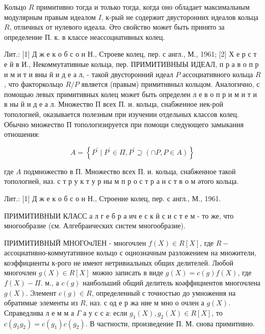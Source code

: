 \documentclass[10pt]{article}
\begin{document}
Кольцо $R$ примитивно тогда и только тогда, когда оно обладает максимальным модулярным правым идеалом $I$, к-рый не содержит двусторонних идеалов кольца $R$, отличных от нулевого идеала. Әто свойство может быть принято за определение П. к. в классе неассоциативных колец.



Лит.: [1] Д ж е к о б с о н Н., Строеве колец, пер. с англ., М., 1961; [2] Х е р с т е й в И., Некоммутативные кольца, пер. ПРИМИТИВНЫЫ ИДЕАЛ, п р а в о п р и м и т и вны й и д е а л, - такой двусторонний идеал $P$ ассоциативного кольца $R$, что факторкольцо $R / P$ является (правым) примитивныл кольцом. Аналогично, с помощью левых примитивных колец может быть определен л е в о п р и м и т и в ны й и д е а л. Множество П всех П. и. кольца, снабженное нек-рой топологией, оказывается полезным при изучении отдельных классов колец. Обычно множество П топологизируется при помощи следующего замыкания отношения:



\[

A=\left\{P^{\prime} \mid P^{\prime} \in \Pi, P^{\prime} \supseteq(\cap P, P \in A)\right\}

\]



где $A$ подмножество в П. Множество всех П. и. кольца, снабженное такой топологией, наз. с т р у к т у р ны м п р о с т р а н с т в о м әтого кольца.



Лит.: [1] Д ж е к о б с о н Н., Строение колец, пер. с англ., М., 1961.



ПРИМИТИВНЫИ КЛАСС а л г е б р а ич е с к й с и с т е м - то же, что многообразие (см. Алгебраических систем многообразие).



ПРИМИТИВНЫЙ МНОГОчЛЕН - многочлен $f(X) \in R[X]$, где $R-$ ассоциативно-коммутативное кольцо с оцнозначным разложением на множители, коэффициенты к-рого не имеют нетривиальных общих делителей. Любой многочлен $g(X) \in R[X]$ можно записать в виде $g(X)=c(g) f(X)$, где $f(X)-\Pi$. м., а $c(g)$ наибольший общий делитель коәффициентов многочлена $g(X)$. Элемент $c(g) \in R$, определенный с точностью до умножения на обратимые элементы из $R$, наз. с од е р жа ние м мно о очлен а $g(X)$. Справедлива л е м м а $\Gamma$ а у с с а: если $g_{1}(X), g_{2}(X) \in R[X]$, то $c\left(g_{1} g_{2}\right)=c\left(g_{1}\right) c\left(g_{2}\right)$. В частности, произведение П. М. снова примитивно.
\end{document}
